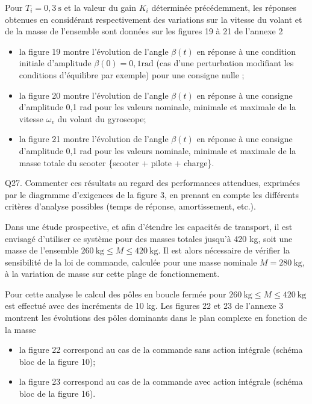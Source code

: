 \documentclass[10pt]{article}
\begin{document}
Pour $T_{i}=0,3 \mathrm{~s}$ et la valeur du gain $K_{i}$ déterminée précédemment, les réponses obtenues en considérant respectivement des variations sur la vitesse du volant et de la masse de l'ensemble sont données sur les figures 19 à 21 de l'annexe 2

\begin{itemize}
  \item[-] la figure 19 montre l'évolution de l'angle $\beta(t)$ en réponse à une condition initiale d'amplitude $\beta(0)=0,1 \mathrm{rad}$ (cas d'une perturbation modifiant les conditions d'équilibre par exemple) pour une consigne nulle ;
  \item[-] la figure 20 montre l'évolution de l'angle $\beta(t)$ en réponse à une consigne d'amplitude 0,1 rad pour les valeurs nominale, minimale et maximale de la vitesse $\omega_{v}$ du volant du gyroscope;
  \item[-] la figure 21 montre l'évolution de l'angle $\beta(t)$ en réponse à une consigne d'amplitude 0,1 rad pour les valeurs nominale, minimale et maximale de la masse totale du scooter \{scooter + pilote + charge\}.
\end{itemize}

Q27. Commenter ces résultats au regard des performances attendues, exprimées par le diagramme d'exigences de la figure 3, en prenant en compte les différents critères d'analyse possibles (temps de réponse, amortissement, etc.).

Dans une étude prospective, et afin d'étendre les capacités de transport, il est envisagé d'utiliser ce système pour des masses totales jusqu'à 420 kg, soit une masse de l'ensemble $260 \mathrm{~kg} \leq M \leq 420 \mathrm{~kg}$. Il est alors nécessaire de vérifier la sensibilité de la loi de commande, calculée pour une masse nominale $M=280 \mathrm{~kg}$, à la variation de masse sur cette plage de fonctionnement.

Pour cette analyse le calcul des pôles en boucle fermée pour $260 \mathrm{~kg} \leq M \leq 420 \mathrm{~kg}$ est effectué avec des incréments de 10 kg. Les figures 22 et 23 de l'annexe 3 montrent les évolutions des pôles dominants dans le plan complexe en fonction de la masse

\begin{itemize}
  \item[-] la figure 22 correspond au cas de la commande sans action intégrale (schéma bloc de la figure 10);
  \item[-] la figure 23 correspond au cas de la commande avec action intégrale (schéma bloc de la figure 16).
\end{itemize}
\end{document}
